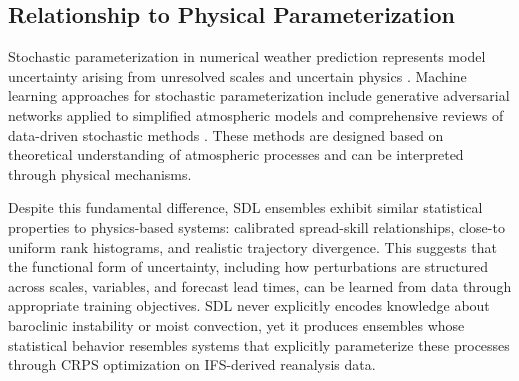 \documentclass{agujournal2019}
\begin{document}


\subsection{Relationship to Physical Parameterization}

Stochastic parameterization in numerical weather prediction represents model uncertainty arising from unresolved scales and uncertain physics \cite{berner2017stochastic, palmer2009stochastic, palmer2019stochastic}. Machine learning approaches for stochastic parameterization include generative adversarial networks applied to simplified atmospheric models \cite{gagne2020machine} and comprehensive reviews of data-driven stochastic methods \cite{christensen2024machine}. These methods are designed based on theoretical understanding of atmospheric processes and can be interpreted through physical mechanisms. 

Despite this fundamental difference, SDL ensembles exhibit similar statistical properties to physics-based systems: calibrated spread-skill relationships, close-to uniform rank histograms, and realistic trajectory divergence. This suggests that the functional form of uncertainty, including how perturbations are structured across scales, variables, and forecast lead times, can be learned from data through appropriate training objectives. SDL never explicitly encodes knowledge about baroclinic instability or moist convection, yet it produces ensembles whose statistical behavior resembles systems that explicitly parameterize these processes through CRPS optimization on IFS-derived reanalysis data.
\end{document}
